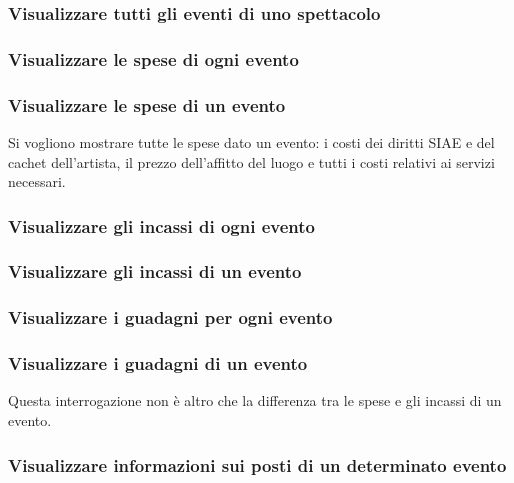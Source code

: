 \documentclass[a4paper,11pt]{article}
\begin{document}
\subsubsection{Visualizzare tutti gli eventi di uno spettacolo}


\subsubsection{Visualizzare le spese di ogni evento}


\subsubsection{Visualizzare le spese di un evento}
Si vogliono mostrare tutte le spese dato un evento: i costi dei diritti SIAE e del
cachet dell'artista, il prezzo dell'affitto del luogo e tutti i costi relativi ai
servizi necessari.


\subsubsection{Visualizzare gli incassi di ogni evento}


\subsubsection{Visualizzare gli incassi di un evento}


\subsubsection{Visualizzare i guadagni per ogni evento}


\subsubsection{Visualizzare i guadagni di un evento}
Questa interrogazione non è altro che la differenza tra le spese e gli incassi di un evento.


\subsubsection{Visualizzare informazioni sui posti di un determinato evento}
\end{document}
